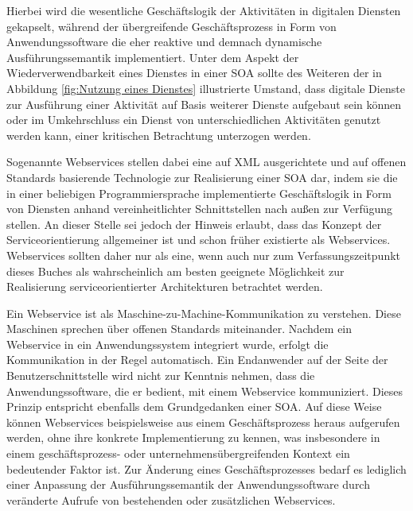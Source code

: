 Hierbei wird die wesentliche Geschäftslogik der Aktivitäten in digitalen Diensten gekapselt, während der übergreifende Geschäftsprozess in Form von Anwendungssoftware die eher reaktive und demnach dynamische Ausführungssemantik implementiert. 
\cite{Teusch.2016}
Unter dem Aspekt der Wiederverwendbarkeit eines Dienstes in einer \ac{SOA} sollte des Weiteren der in Abbildung \ref{fig:Nutzung eines Dienstes} illustrierte Umstand, dass digitale Dienste zur Ausführung einer Aktivität auf Basis weiterer Dienste aufgebaut sein können oder im Umkehrschluss ein Dienst von unterschiedlichen Aktivitäten genutzt werden kann, einer kritischen Betrachtung unterzogen werden.
\cite{Masak.2007}

Sogenannte Webservices stellen dabei eine auf \ac{XML} ausgerichtete und auf offenen Standards basierende Technologie zur Realisierung einer \ac{SOA} dar, indem sie die in einer beliebigen Programmiersprache implementierte Geschäftslogik in Form von Diensten anhand vereinheitlichter Schnittstellen nach außen zur Verfügung stellen.
\cite{Masak.2005}
An dieser Stelle sei jedoch der Hinweis erlaubt, dass das Konzept der Serviceorientierung allgemeiner ist und schon früher existierte als Webservices. Webservices sollten daher nur als eine, wenn auch nur zum Verfassungszeitpunkt dieses Buches als wahrscheinlich am besten geeignete Möglichkeit zur Realisierung serviceorientierter Architekturen betrachtet werden.

Ein Webservice ist als Maschine-zu-Machine-Kommunikation zu verstehen. Diese Maschinen sprechen über offenen Standards miteinander. 
\cite{Finger.2009b}
Nachdem ein Webservice in ein Anwendungssystem integriert wurde, erfolgt die Kommunikation in der Regel automatisch. 
Ein Endanwender auf der Seite der Benutzerschnittstelle wird nicht zur Kenntnis nehmen, dass die Anwendungssoftware, die er bedient, mit einem Webservice kommuniziert. Dieses Prinzip entspricht ebenfalls dem Grundgedanken einer \ac{SOA}.
\cite{Teusch.2016}
Auf diese Weise können Webservices beispielsweise aus einem Geschäftsprozess heraus aufgerufen werden, ohne ihre konkrete Implementierung zu kennen, was insbesondere in einem geschäftsprozess- oder unternehmensübergreifenden Kontext ein bedeutender Faktor ist. Zur Änderung eines Geschäftsprozesses bedarf es lediglich einer Anpassung der Ausführungssemantik der Anwendungssoftware durch veränderte Aufrufe von bestehenden oder zusätzlichen Webservices.


